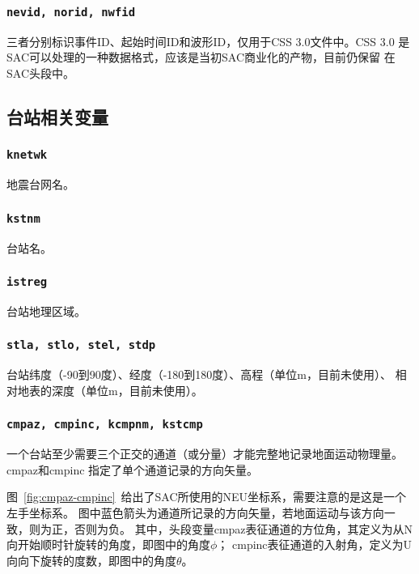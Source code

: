 \subsubsection{\texttt{nevid, norid, nwfid}}
三者分别标识事件ID、起始时间ID和波形ID，仅用于CSS 3.0文件中。CSS 3.0
是SAC可以处理的一种数据格式，应该是当初SAC商业化的产物，目前仍保留
在SAC头段中。

\subsection{台站相关变量}
\subsubsection{\texttt{knetwk}}
地震台网名。

\subsubsection{\texttt{kstnm}}
台站名。

\subsubsection{\texttt{istreg}\dag}
台站地理区域。

\subsubsection{\texttt{stla, stlo, stel, stdp}}
台站纬度（-90到90度）、经度（-180到180度）、高程（单位m，目前未使用）、
相对地表的深度（单位m，目前未使用）。

\subsubsection{\texttt{cmpaz, cmpinc, kcmpnm, kstcmp}}
一个台站至少需要三个正交的通道（或分量）才能完整地记录地面运动物理量。cmpaz和cmpinc
指定了单个通道记录的方向矢量。

图~\ref{fig:cmpaz-cmpinc}~给出了SAC所使用的NEU坐标系，需要注意的是这是一个左手坐标系。
图中蓝色箭头为通道所记录的方向矢量，若地面运动与该方向一致，则为正，否则为负。
其中，头段变量cmpaz表征通道的方位角，其定义为从N向开始顺时针旋转的角度，即图中的角度$\phi$；
cmpinc表征通道的入射角，定义为U向向下旋转的度数，即图中的角度$\theta$。

